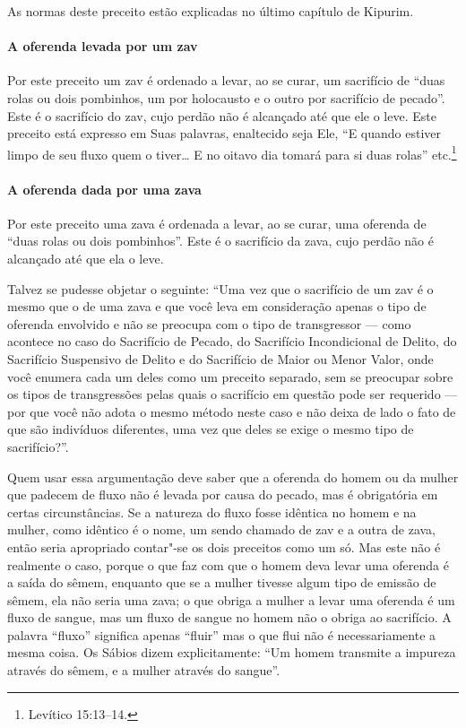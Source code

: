 \begin{multicols}{2}
As normas deste preceito estão explicadas no último capítulo de Kipurim\starr.

\paragraph{A oferenda levada por um zav\starr}

Por este preceito um zav\starr{} é ordenado a levar, ao
se curar, um sacrifício de ``duas rolas ou dois pombinhos, um por holocausto e o
outro por sacrifício de pecado''. Este é o sacrifício do zav\starr, cujo perdão não
é alcançado até que ele o leve. Este preceito está expresso em Suas
palavras, enaltecido seja Ele, ``E quando estiver limpo de seu fluxo
quem o tiver\ldots{} E no oitavo dia tomará para si duas rolas'' etc.\footnote{Levítico 15:13--14.}

\paragraph{A oferenda dada por uma zava\starr}

Por este preceito uma zava\starr{} é ordenada a levar,
ao se curar, uma oferenda de ``duas rolas ou dois pombinhos''. Este é o
sacrifício da zava\starr, cujo perdão não é alcançado até que ela o leve.

Talvez se pudesse objetar o seguinte: ``Uma vez que o sacrifício de um
zav\starr{} é o mesmo que o de uma zava\starr{} e que você leva em consideração
apenas o tipo de oferenda envolvido e não se preocupa com o tipo de
transgressor --- como acontece no caso do Sacrifício de Pecado, do
Sacrifício Incondicional de Delito, do Sacrifício Suspensivo de Delito
e do Sacrifício de Maior ou Menor Valor, onde você enumera cada um deles
como um preceito separado, sem se preocupar sobre os tipos de
transgressões pelas quais o sacrifício em questão pode ser requerido ---
por que você não adota o mesmo método neste caso e não deixa de lado o
fato de que são indivíduos diferentes, uma vez que deles se exige o
mesmo tipo de sacrifício?''.

Quem usar essa argumentação deve saber que a oferenda do homem ou da
mulher que padecem de fluxo não é levada por causa do pecado, mas é
obrigatória em certas circunstâncias. Se a natureza do fluxo fosse
idêntica no homem e na mulher, como idêntico é o nome, um sendo chamado
de zav\starr{} e a outra de zava\starr, então seria apropriado contar"-se os
dois preceitos como um só. Mas este não é realmente o caso, porque o que
faz com que o homem deva levar uma oferenda é a saída do sêmem, enquanto
que se a mulher tivesse algum tipo de emissão de sêmem, ela não seria
uma zava\starr; o que obriga a mulher a levar uma oferenda é um fluxo de sangue, mas um fluxo de sangue
no homem não o obriga ao sacrifício. A palavra ``fluxo'' significa
apenas ``fluir'' mas o que flui não é necessariamente a mesma coisa. Os
Sábios dizem explicitamente: ``Um homem transmite a impureza através do
sêmem, e a mulher através do sangue''.


\end{multicols}
